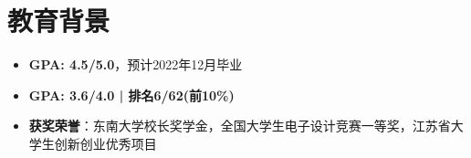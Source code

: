\documentclass{resume}
\begin{document}


 

\section{教育背景}
\begin{itemize}[parsep=0.2ex]
  \item \textbf{GPA: 4.5/5.0}，预计2022年12月毕业
\end{itemize}
\begin{itemize}[parsep=0.2ex]
  \item \textbf{GPA: 3.6/4.0 | 排名6/62(前10\%)}
  \item \textbf{获奖荣誉}：东南大学校长奖学金，全国大学生电子设计竞赛一等奖，江苏省大学生创新创业优秀项目
\end{itemize}


\end{document}
